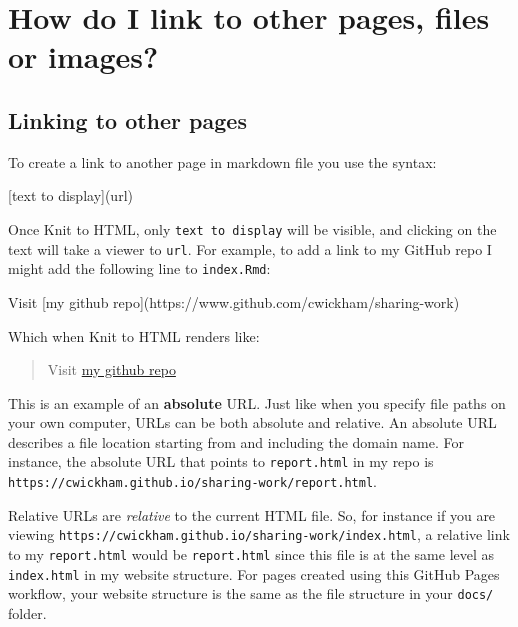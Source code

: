 \documentclass[]{Nemilov}
\newenvironment{Shaded}{\begin{snugshade}}{\end{snugshade}}
\newcommand{\NormalTok}[1]{#1}
\newcommand{\OtherTok}[1]{\textcolor[rgb]{0.56,0.35,0.01}{#1}}
\begin{document}
\hypertarget{how-do-i-link-to-other-pages-files-or-images}{%
\section{How do I link to other pages, files or images?}\label{how-do-i-link-to-other-pages-files-or-images}}

\hypertarget{linking-to-other-pages}{%
\subsection{Linking to other pages}\label{linking-to-other-pages}}

To create a link to another page in markdown file you use the syntax:

\begin{Shaded}
\begin{Highlighting}[]
\OtherTok{[text to display](url)}
\end{Highlighting}
\end{Shaded}

Once Knit to HTML, only \texttt{text\ to\ display} will be visible, and clicking on the text will take a viewer to \texttt{url}. For example, to add a link to my GitHub repo I might add the following line to \texttt{index.Rmd}:

\begin{Shaded}
\begin{Highlighting}[]
\NormalTok{Visit }\OtherTok{[my github repo](https://www.github.com/cwickham/sharing-work)}
\end{Highlighting}
\end{Shaded}

Which when Knit to HTML renders like:

\begin{quote}
Visit \href{https://www.github.com/cwickham/sharing-work}{my github repo}
\end{quote}

This is an example of an \textbf{absolute} URL. Just like when you specify file paths on your own computer, URLs can be both absolute and relative. An absolute URL describes a file location starting from and including the domain name. For instance, the absolute URL that points to \texttt{report.html} in my repo is \texttt{https://cwickham.github.io/sharing-work/report.html}.

Relative URLs are \emph{relative} to the current HTML file. So, for instance if you are viewing \texttt{https://cwickham.github.io/sharing-work/index.html}, a relative link to my \texttt{report.html} would be \texttt{report.html} since this file is at the same level as \texttt{index.html} in my website structure. For pages created using this GitHub Pages workflow, your website structure is the same as the file structure in your \texttt{docs/} folder.
\end{document}
